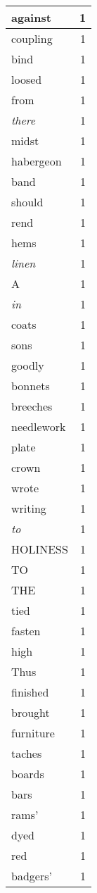 \begin{center}
\begin{longtable}{l|r}
against & 1 \\ \hline
coupling & 1 \\ \hline
bind & 1 \\ \hline
loosed & 1 \\ \hline
from & 1 \\ \hline
\emph{there} & 1 \\ \hline
midst & 1 \\ \hline
habergeon & 1 \\ \hline
band & 1 \\ \hline
should & 1 \\ \hline
rend & 1 \\ \hline
hems & 1 \\ \hline
\emph{linen} & 1 \\ \hline
A & 1 \\ \hline
\emph{in} & 1 \\ \hline
coats & 1 \\ \hline
sons & 1 \\ \hline
goodly & 1 \\ \hline
bonnets & 1 \\ \hline
breeches & 1 \\ \hline
needlework & 1 \\ \hline
plate & 1 \\ \hline
crown & 1 \\ \hline
wrote & 1 \\ \hline
writing & 1 \\ \hline
\emph{to} & 1 \\ \hline
HOLINESS & 1 \\ \hline
TO & 1 \\ \hline
THE & 1 \\ \hline
tied & 1 \\ \hline
fasten & 1 \\ \hline
high & 1 \\ \hline
Thus & 1 \\ \hline
finished & 1 \\ \hline
brought & 1 \\ \hline
furniture & 1 \\ \hline
taches & 1 \\ \hline
boards & 1 \\ \hline
bars & 1 \\ \hline
rams' & 1 \\ \hline
dyed & 1 \\ \hline
red & 1 \\ \hline
badgers' & 1 \\ \hline

\end{longtable}
\end{center}
